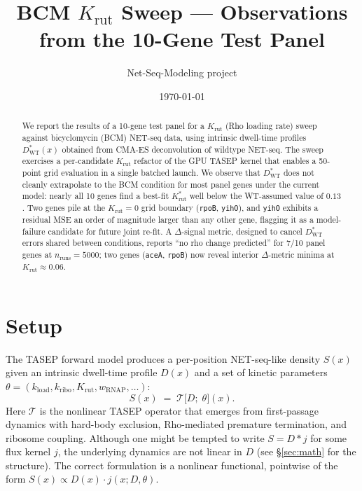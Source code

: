 \documentclass[11pt]{article}
\title{BCM $K_{\text{rut}}$ Sweep --- Observations from the 10-Gene Test Panel}
\author{Net-Seq-Modeling project}
\date{\today}
\newcommand{\Krut}{K_{\text{rut}}}
\newcommand{\kload}{k_{\text{load}}}
\newcommand{\kribo}{k_{\text{ribo}}}
\newcommand{\Dstar}{D^{\!*}}
\begin{document}
\maketitle

\begin{abstract}
We report the results of a 10-gene test panel for a $\Krut$ (Rho loading rate)
sweep against bicyclomycin (BCM) NET-seq data, using intrinsic dwell-time
profiles $\Dstar_{\text{WT}}(x)$ obtained from CMA-ES deconvolution of wildtype
NET-seq. The sweep exercises a per-candidate $\Krut$ refactor of the GPU TASEP
kernel that enables a 50-point grid evaluation in a single batched launch. We
observe that $\Dstar_{\text{WT}}$ does not cleanly extrapolate to the BCM
condition for most panel genes under the current model: nearly all 10 genes
find a best-fit $K^{*}_{\text{rut}}$ well below the WT-assumed value of $0.13$. Two genes
pile at the $\Krut=0$ grid boundary (\texttt{rpoB}, \texttt{yihO}), and
\texttt{yihO} exhibits a residual MSE an order of magnitude larger than any
other gene, flagging it as a model-failure candidate for future joint re-fit.
A $\Delta$-signal metric, designed to cancel $\Dstar_{\text{WT}}$ errors shared
between conditions, reports ``no rho change predicted'' for 7/10 panel genes at
$n_{\text{runs}}=5000$; two genes (\texttt{aceA}, \texttt{rpoB}) now reveal
interior $\Delta$-metric minima at $K_{\text{rut}} \approx 0.06$.
\end{abstract}

\section{Setup}

The TASEP forward model produces a per-position NET-seq-like density
$S(x)$ given an intrinsic dwell-time profile $D(x)$ and a set of kinetic
parameters $\theta = (\kload, \kribo, \Krut, w_{\text{RNAP}}, \ldots)$:
\begin{equation}
  S(x) \;=\; \mathcal{T}\bigl[D;\;\theta\bigr](x).
\end{equation}
Here $\mathcal{T}$ is the nonlinear TASEP operator that emerges from
first-passage dynamics with hard-body exclusion, Rho-mediated premature
termination, and ribosome coupling. Although one might be tempted to write
$S = D \ast j$ for some flux kernel $j$, the underlying dynamics are not
linear in $D$ (see \S\ref{sec:math} for the structure). The correct
formulation is a nonlinear functional, pointwise of the form
$S(x) \propto D(x)\cdot j(x;D,\theta)$.
\end{document}
